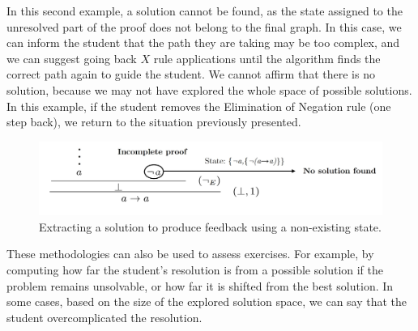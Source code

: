In this second example, a solution cannot be found, as the state assigned to the unresolved part of the proof does not belong to the final graph. In this case, we can inform the student that the path they are taking may be too complex, and we can suggest going back \(X\) rule applications until the algorithm finds the correct path again to guide the student. We cannot affirm that there is no solution, because we may not have explored the whole space of possible solutions. In this example, if the student removes the Elimination of Negation rule (one step back), we return to the situation previously presented.

\begin{figure}
    \centering
    \includegraphics[width=1\linewidth]{resources/trim-neg-feed.jpg}
    \caption{Extracting a solution to produce feedback using a non-existing state.}
    \label{fig:extract-solution2}
\end{figure}

These methodologies can also be used to assess exercises. For example, by computing how far the student’s resolution is from a possible solution if the problem remains unsolvable, or how far it is shifted from the best solution. In some cases, based on the size of the explored solution space, we can say that the student overcomplicated the resolution.
